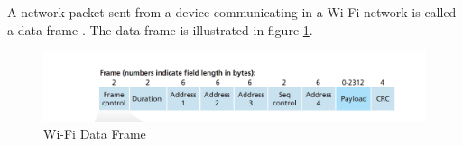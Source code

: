 \\\\
A network packet sent from a device communicating in a Wi-Fi network is called a data frame \cite{Datacom}. The data frame is illustrated in figure \ref{fig:WiFiDataframe}.

\begin{figure} [!h]
    \includegraphics[width=1\textwidth]{figures/WifiDataFrame.png}
    \caption{Wi-Fi Data Frame \cite{Datacom}}
    \centering
    \label{fig:WiFiDataframe}
\end{figure}

